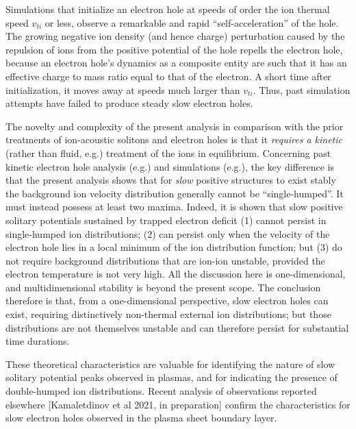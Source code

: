 \documentclass[pre]{revtex4-2}
\begin{document}
Simulations that initialize an electron hole at speeds of order the
ion thermal speed $v_{ti}$ or less, observe a remarkable and rapid
``self-acceleration'' of the
hole\cite{Saeki1991,Muschietti1999,Eliasson2004,Eliasson2006,Zhou2016}. The growing
negative ion density (and hence charge) perturbation caused by the
repulsion of ions from the positive potential of the hole repells the
electron hole, because an electron hole's dynamics as a composite
entity are such that it has an effective charge to mass ratio equal to
that of the electron\cite{Haakonsen2015,Hutchinson2016}. A short time
after initialization, it moves away at speeds much larger than
$v_{ti}$. Thus, past simulation attempts have failed to produce steady
slow electron holes.

The novelty and complexity of the present analysis in comparison with
the prior treatments of ion-acoustic solitons and electron holes is
that it \emph{requires a kinetic} (rather than fluid, e.g.\cite{Kakad2016})
treatment of the ions in equilibrium. Concerning past kinetic electron
hole analysis (e.g.\cite{Dupree1982}) and simulations
(e.g.\cite{Eliasson2004}), the key difference is that the present
analysis shows that for \emph{slow} positive structures to exist
stably the background ion velocity distribution generally cannot be
``single-humped''. It must instead possess at least two maxima.
Indeed, it is shown that slow positive solitary potentials sustained
by trapped electron deficit (1) cannot persist in single-humped ion
distributions; (2) can persist only when the velocity of the electron
hole lies in a local minimum of the ion distribution function; but (3)
do not require background distributions that are ion-ion unstable,
provided the electron temperature is not very high. All the discussion
here is one-dimensional, and multidimensional stability is beyond the
present scope. The conclusion therefore is that, from a
one-dimensional perspective, slow electron holes can exist, requiring
distinctively non-thermal external ion distributions; but those
distributions are not themselves unstable and can therefore persist
for substantial time durations.

These theoretical characteristics are valuable for identifying the
nature of slow solitary potential peaks observed in plasmas, and for
indicating the presence of double-humped ion distributions. Recent
analysis of observations reported elsewhere [Kamaletdinov et al 2021,
in preparation] confirm the characteristics for slow electron holes
observed in the plasma sheet boundary layer.
\end{document}
